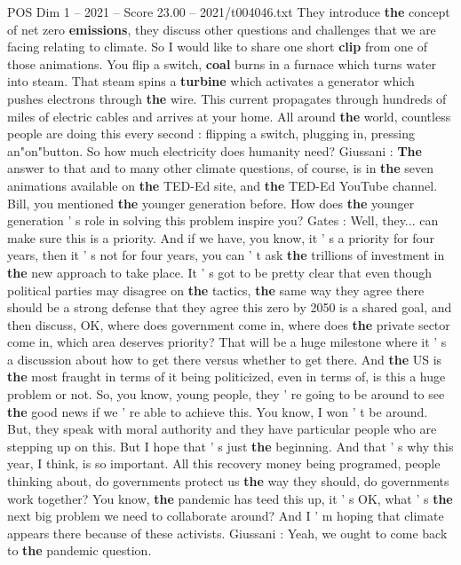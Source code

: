 \begin{textsample}{POS Dim 1 – 2021 – Score 23.00 – 2021/t004046.txt}
They introduce \textbf{the} concept of net zero \textbf{emissions}, they discuss other questions and challenges that we are facing relating to climate.
So I would like to share one short \textbf{clip} from one of those animations.
You flip a switch, \textbf{coal} burns in a furnace which turns water into steam.
That steam spins a \textbf{turbine} which activates a generator which pushes electrons through \textbf{the} wire.
This current propagates through hundreds of miles of electric cables and arrives at your home.
All around \textbf{the} world, countless people are doing this every second : flipping a switch, plugging in, pressing an"on"button.
So how much electricity does humanity need?
Giussani : \textbf{The} answer to that and to many other climate questions, of course, is in \textbf{the} seven animations available on \textbf{the} TED-Ed site, and \textbf{the} TED-Ed YouTube channel.
Bill, you mentioned \textbf{the} younger generation before.
How does \textbf{the} younger generation ' s role in solving this problem inspire you?
Gates : Well, they... can make sure this is a priority.
And if we have, you know, it ' s a priority for four years, then it ' s not for four years, you can ' t ask \textbf{the} trillions of investment in \textbf{the} new approach to take place.
It ' s got to be pretty clear that even though political parties may disagree on \textbf{the} tactics, \textbf{the} same way they agree there should be a strong defense that they agree this zero by 2050 is a shared goal, and then discuss, OK, where does government come in, where does \textbf{the} private sector come in, which area deserves priority?
That will be a huge milestone where it ' s a discussion about how to get there versus whether to get there.
And \textbf{the} US is \textbf{the} most fraught in terms of it being politicized, even in terms of, is this a huge problem or not.
So, you know, young people, they ' re going to be around to see \textbf{the} good news if we ' re able to achieve this.
You know, I won ' t be around.
But, they speak with moral authority and they have particular people who are stepping up on this.
But I hope that ' s just \textbf{the} beginning.
And that ' s why this year, I think, is so important.
All this recovery money being programed, people thinking about, do governments protect us \textbf{the} way they should, do governments work together?
You know, \textbf{the} pandemic has teed this up, it ' s OK, what ' s \textbf{the} next big problem we need to collaborate around?
And I ' m hoping that climate appears there because of these activists.
Giussani : Yeah, we ought to come back to \textbf{the} pandemic question.

\end{textsample}
